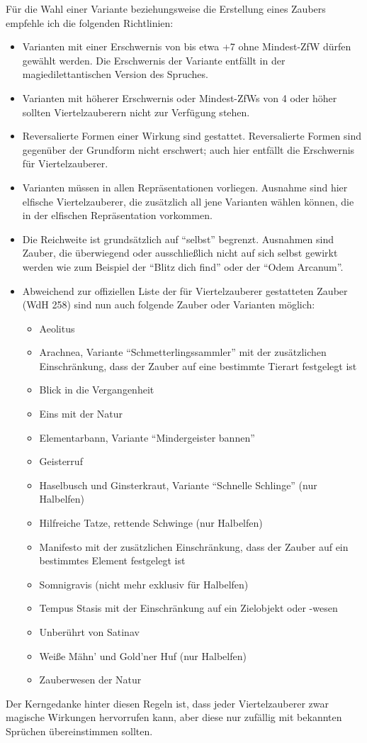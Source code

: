 Für die Wahl einer Variante beziehungsweise die Erstellung eines Zaubers empfehle ich die folgenden Richtlinien:
\begin{itemize}
	\item Varianten mit einer Erschwernis von bis etwa +7 ohne Mindest-ZfW dürfen gewählt werden. Die Erschwernis der Variante entfällt in der magiedilettantischen Version des Spruches.
	\item Varianten mit höherer Erschwernis oder Mindest-ZfWs von 4 oder höher sollten Viertelzauberern nicht zur Verfügung stehen.
	\item Reversalierte Formen einer Wirkung sind gestattet. Reversalierte Formen sind gegenüber der Grundform nicht erschwert; auch hier entfällt die Erschwernis für Viertelzauberer.
	\item Varianten müssen in allen Repräsentationen vorliegen. Ausnahme sind hier elfische Viertelzauberer, die zusätzlich all jene Varianten wählen können, die in der elfischen Repräsentation vorkommen.
	\item Die Reichweite ist grundsätzlich auf \enquote{selbst} begrenzt. Ausnahmen sind Zauber, die überwiegend oder ausschließlich nicht auf sich selbst gewirkt werden wie zum Beispiel der \enquote{Blitz dich find} oder der \enquote{Odem Arcanum}.
	\item Abweichend zur offiziellen Liste der für Viertelzauberer gestatteten Zauber (WdH 258) sind nun auch folgende Zauber oder Varianten möglich:
\begin{itemize}
	\item Aeolitus
	\item Arachnea, Variante \enquote{Schmetterlingssammler} mit der zusätzlichen Einschränkung, dass der Zauber auf eine bestimmte Tierart festgelegt ist
	\item Blick in die Vergangenheit
	\item Eins mit der Natur
	\item Elementarbann, Variante \enquote{Mindergeister bannen}
	\item Geisterruf
	\item Haselbusch und Ginsterkraut, Variante \enquote{Schnelle Schlinge} (nur Halbelfen)
	\item Hilfreiche Tatze, rettende Schwinge (nur Halbelfen)
	\item Manifesto mit der zusätzlichen Einschränkung, dass der Zauber auf ein bestimmtes Element festgelegt ist
	\item Somnigravis (nicht mehr exklusiv für Halbelfen)
	\item Tempus Stasis mit der Einschränkung auf ein Zielobjekt oder -wesen
	\item Unberührt von Satinav
	\item Weiße Mähn' und Gold'ner Huf (nur Halbelfen)
	\item Zauberwesen der Natur
\end{itemize}

\end{itemize}
Der Kerngedanke hinter diesen Regeln ist, dass jeder Viertelzauberer zwar magische Wirkungen hervorrufen kann, aber diese nur zufällig mit bekannten Sprüchen übereinstimmen sollten.

